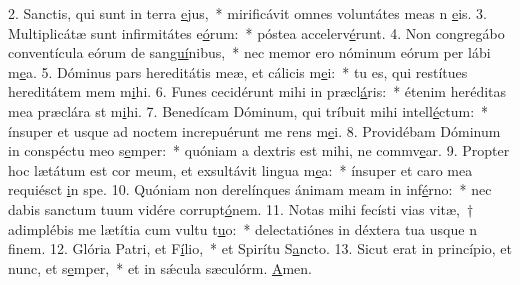 2. Sanctis, qui sunt in terra \uline{e}jus,~* mirificávit omnes voluntátes meas n \uline{e}is.
3. Multiplicátæ sunt infirmitátes e\uline{ó}rum:~* póstea accelerv\uline{é}runt.
4. Non congregábo conventícula eórum de san\uline{guí}nibus,~* nec memor ero nóminum eórum per lábi m\uline{e}a.
5. Dóminus pars hereditátis meæ, et cálicis m\uline{e}i:~* tu es, qui restítues hereditátem mem m\uline{i}hi.
6. Funes cecidérunt mihi in præcl\uline{á}ris:~* étenim heréditas mea præclára st m\uline{i}hi.
7. Benedícam Dóminum, qui tríbuit mihi intell\uline{é}ctum:~* ínsuper et usque ad noctem increpuérunt me rens m\uline{e}i.
8. Providébam Dóminum in conspéctu meo s\uline{e}mper:~* quóniam a dextris est mihi, ne commv\uline{e}ar.
9. Propter hoc lætátum est cor meum, et exsultávit lingua m\uline{e}a:~* ínsuper et caro mea requiésct \uline{i}n spe.
10. Quóniam non derelínques ánimam meam in inf\uline{é}rno:~* nec dabis sanctum tuum vidére corrupt\uline{ó}nem.
11. Notas mihi fecísti vias vitæ,~† adimplébis me lætítia cum vultu t\uline{u}o:~* delectatiónes in déxtera tua usque n f\uline{i}nem.
12. Glória Patri, et F\uline{í}lio,~* et Spirítu S\uline{a}ncto.
13. Sicut erat in princípio, et nunc, et s\uline{e}mper,~* et in sǽcula sæculórm. \uline{A}men.
